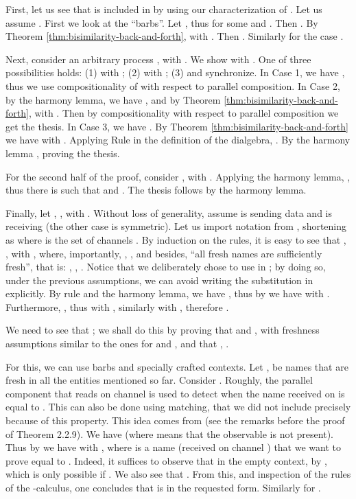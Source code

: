 \documentclass[orivec]{llncs}
\newcommand{\proend}{\medskip}
\renewenvironment{proof}{\begin{pro}}{\proend\end{pro}}
\begin{document}
\begin{proof}
 \noindent First, let us see that  is included in  by using our characterization of . Let us assume . First we look at the ``barbs''. Let , thus  for some  and . 
 Then 
. By Theorem \ref{thm:bisimilarity-back-and-forth},  with . Then . Similarly for the case . 
 
 \medskip
 
 
 \noindent Next, consider an arbitrary process , with . We show  with . One of three possibilities holds: (1)  with ; (2)  with ; (3)  and  synchronize. In Case 1, we have , thus we use compositionality of  with respect to parallel composition. In Case 2, by the harmony lemma, we have , and by Theorem \ref{thm:bisimilarity-back-and-forth},  with . Then by compositionality with respect to parallel composition we get the thesis. In Case 3, we have 
. By Theorem \ref{thm:bisimilarity-back-and-forth} we have  with . Applying Rule  in the definition of the dialgebra, . By the harmony lemma , proving the thesis.
 
 \medskip
 
 \noindent For the second half of the proof, consider , with  . Applying the harmony lemma, , thus there is  such that  and . The thesis follows by the harmony lemma.
 
 \medskip
 \noindent Finally, let , , with . Without loss of generality, assume  is sending data and  is receiving (the other case is symmetric). Let us import notation from \cite{San01}, shortening  as  where  is the set of channels . By induction on the rules, 
it is easy to see that , , with , where, importantly, , , and besides, ``all fresh names are sufficiently fresh'', that is: , , . Notice that we deliberately chose to use  in ; by doing so, under the previous assumptions, we can avoid writing the substitution in  explicitly. By rule  and the harmony lemma, we have , thus by  we have  with . 
Furthermore, , thus  with , similarly  with , therefore . 


 \newcommand{\ndownarrow}{/\hskip -7pt \downarrow}
 
 We need to see that ; we shall do this by proving that  and , with freshness assumptions similar to the ones for  and , and that , . 
 
 For this, we can use barbs and specially crafted contexts.  Let ,  be names that are fresh in all the entities mentioned so far. Consider . Roughly, the parallel component that reads on channel  is used to detect when the name  received on  is equal to . This can also be done using matching, that we did not include precisely because of this property. This idea comes from \cite{San01} (see the remarks before the proof of Theorem 2.2.9).
We have  (where  means that the observable  is not present). Thus by  we have  with , where  is a name (received on channel ) that we want to prove equal to . Indeed, it suffices to observe that in the empty context, by ,  which is only possible if . We also see that . From this, and inspection of the rules of the -calculus, one concludes that  is in the requested form. Similarly for .
\end{proof}
\end{document}

